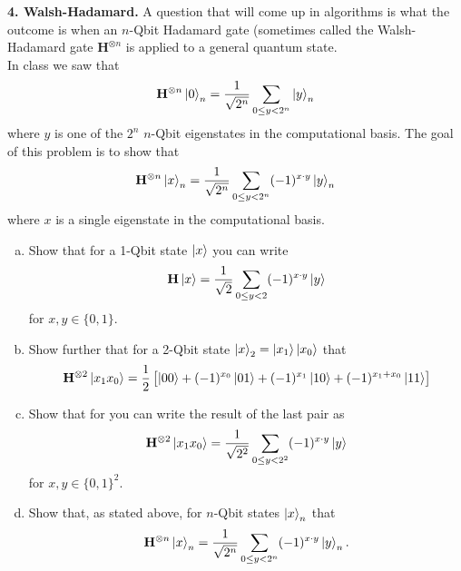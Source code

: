 \documentclass{book}
\theoremstyle{definition}
\newcommand{\f}[2]{\frac{#1}{#2}}
\newcommand{\lb}{\left[}
\newcommand{\rb}{\right]}
\newcommand{\had}{\mathbf{H}}
\begin{document}
\newpage




\noindent \textbf{4. Walsh-Hadamard.} A question that will come up in algorithms is what the outcome is when
an $n$-Qbit Hadamard gate (sometimes called the Walsh-Hadamard gate $\had^{\otimes n}$
is applied to a general quantum state. \\

\noindent In class we saw that
\begin{align}
\had^{\otimes n}\ket{0}_n = \f{1}{\sqrt{2^n}}\sum_{0\leq y < 2^n}\ket{y}_n
\end{align}
where $y$ is one of the $2^n$ $n$-Qbit eigenstates in the computational basis. The goal of this problem is to show that
\begin{align}
\had^{\otimes n}\ket{x}_n = \f{1}{\sqrt{2^n}}\sum_{0 \leq y < 2^n} (-1)^{x\cdot y}\ket{y}_n
\end{align}
where $x$ is a single eigenstate in the computational basis. 
\begin{enumerate}[(a)]
	\item Show that for a 1-Qbit state $\ket{x}$ you can write
	\begin{align}
	\had\ket{x} = \f{1}{\sqrt{2}}\sum_{0\leq y < 2}(-1)^{x\cdot y}\ket{y}
	\end{align}
	for $x,y\in \{0,1\}$.
	
	\item Show further that for a 2-Qbit state $\ket{x}_2 = \ket{x_1}\ket{x_0}$ that
	\begin{align}
	\had^{\otimes 2}\ket{x_1x_0} = \frac{1}{2}\lb \ket{00} + (-1)^{x_0}\ket{01} + (-1)^{x_1}\ket{10} + (-1)^{x_1+x_0}\ket{11} \rb
	\end{align}
	
	\item Show that for you can write the result of the last pair as
	\begin{align}
	\had^{\otimes 2}\ket{x_1x_0} = \f{1}{\sqrt{2^2}}\sum_{0 \leq y < 2^2} (-1)^{x\cdot y}\ket{y}
	\end{align}
	for $x,y\in \{0,1\}^{2}$.
	
	
	\item Show that, as stated above, for $n$-Qbit states $\ket{x}_n$ that
	\begin{align}
	\had^{\otimes n}\ket{x}_n = \f{1}{\sqrt{2^n}} \sum_{0 \leq y < 2^n}(-1)^{x\cdot y}\ket{y}_n.
	\end{align}
	
	
	
	
\end{enumerate}
\end{document}
